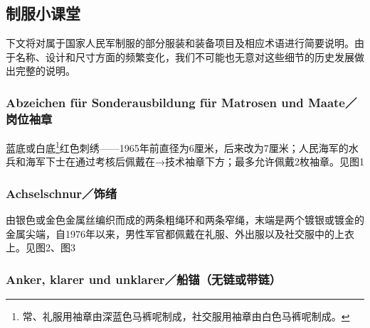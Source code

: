 \subsection*{制服小课堂}

下文将对属于国家人民军制服的部分服装和装备项目及相应术语进行简要说明。由于名称、设计和尺寸方面的频繁变化，我们不可能也无意对这些细节的历史发展做出完整的说明。

\subsubsection*{Abzeichen für Sonderausbildung für Matrosen und Maate／岗位袖章}

蓝底或白底\footnote{常、礼服用袖章由深蓝色马裤呢制成，社交服用袖章由白色马裤呢制成。\cite{clarionv}}红色刺绣——1965年前直径为6厘米，后来改为7厘米；人民海军的水兵和海军下士在通过考核后佩戴在→技术袖章下方；最多允许佩戴2枚袖章。见图1

\subsubsection*{Achselschnur／饰绪}%

由银色或金色金属丝编织而成的两条粗绳环和两条窄绳，末端是两个镀银或镀金的金属尖端，自1976年以来，男性军官都佩戴在礼服、外出服以及社交服中的上衣上。见图2、图3

\subsubsection*{Anker, klarer und unklarer／船锚（无链或带链）}

